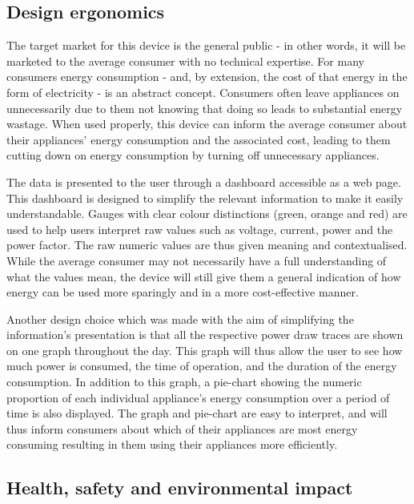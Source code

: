 \subsection{Design ergonomics}
The target market for this device is the general public - in other words, it will be marketed to the average consumer with no technical expertise. For many consumers energy consumption - and, by extension, the cost of that energy in the form of electricity - is an abstract concept. Consumers often leave appliances on unnecessarily due to them not knowing that doing so leads to substantial energy wastage. When used properly, this device can inform the average consumer about their appliances' energy consumption and the associated cost, leading to them cutting down on energy consumption by turning off unnecessary appliances.
\par
The data is presented to the user through a dashboard accessible as a web page. This dashboard is designed to simplify the relevant information to make it easily understandable. Gauges with clear colour distinctions (green, orange and red) are used to help users interpret raw values such as voltage, current, power and the power factor. The raw numeric values are thus given meaning and contextualised. While the average consumer may not necessarily have a full understanding of what the values mean, the device will still give them a general indication of how energy can be used more sparingly and in a more cost-effective manner.
\par 
Another design choice which was made with the aim of simplifying the information's presentation is that all the respective power draw traces are shown on one graph throughout the day. This graph will thus allow the user to see how much power is consumed, the time of operation, and the duration of the energy consumption. In addition to this graph, a pie-chart showing the numeric proportion of each individual appliance's energy consumption over a period of time is also displayed. The graph and pie-chart are easy to interpret, and will thus inform consumers about which of their appliances are most energy consuming resulting in them using their appliances more efficiently.
\subsection{Health, safety and environmental impact}
